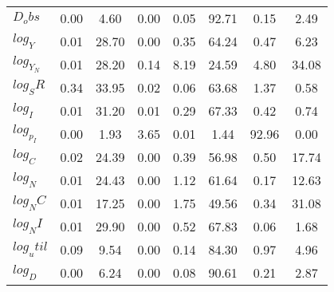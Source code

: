 \begin{center}
\begin{longtable}{lccccccc}
$D_obs     $	 & 	        0.00	 & 	        4.60	 & 	        0.00	 & 	        0.05	 & 	       92.71	 & 	        0.15	 & 	        2.49 \\ 
$log_Y     $	 & 	        0.01	 & 	       28.70	 & 	        0.00	 & 	        0.35	 & 	       64.24	 & 	        0.47	 & 	        6.23 \\ 
$log_Y_N   $	 & 	        0.01	 & 	       28.20	 & 	        0.14	 & 	        8.19	 & 	       24.59	 & 	        4.80	 & 	       34.08 \\ 
$log_SR    $	 & 	        0.34	 & 	       33.95	 & 	        0.02	 & 	        0.06	 & 	       63.68	 & 	        1.37	 & 	        0.58 \\ 
$log_I     $	 & 	        0.01	 & 	       31.20	 & 	        0.01	 & 	        0.29	 & 	       67.33	 & 	        0.42	 & 	        0.74 \\ 
$log_p_I   $	 & 	        0.00	 & 	        1.93	 & 	        3.65	 & 	        0.01	 & 	        1.44	 & 	       92.96	 & 	        0.00 \\ 
$log_C     $	 & 	        0.02	 & 	       24.39	 & 	        0.00	 & 	        0.39	 & 	       56.98	 & 	        0.50	 & 	       17.74 \\ 
$log_N     $	 & 	        0.01	 & 	       24.43	 & 	        0.00	 & 	        1.12	 & 	       61.64	 & 	        0.17	 & 	       12.63 \\ 
$log_NC    $	 & 	        0.01	 & 	       17.25	 & 	        0.00	 & 	        1.75	 & 	       49.56	 & 	        0.34	 & 	       31.08 \\ 
$log_NI    $	 & 	        0.01	 & 	       29.90	 & 	        0.00	 & 	        0.52	 & 	       67.83	 & 	        0.06	 & 	        1.68 \\ 
$log_util  $	 & 	        0.09	 & 	        9.54	 & 	        0.00	 & 	        0.14	 & 	       84.30	 & 	        0.97	 & 	        4.96 \\ 
$log_D     $	 & 	        0.00	 & 	        6.24	 & 	        0.00	 & 	        0.08	 & 	       90.61	 & 	        0.21	 & 	        2.87 \\ 
\end{longtable}
 \end{center}
